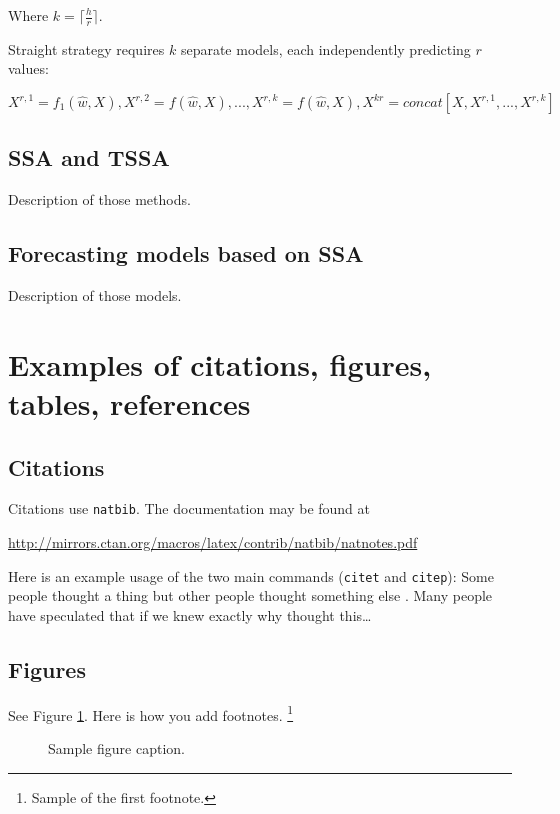 \documentclass{article}
\begin{document}
Where \( k = \lceil \frac{h}{r} \rceil.\)

Straight strategy requires \(k\) separate models, each independently predicting \(r\) values:

\begin{equation}
	X^{r, 1} = f_1(\widehat{w}, X), 
	X^{r, 2} = f(\widehat{w}, X),
	...,
	X^{r, k} = f(\widehat{w}, X),
	X^{kr} = concat[X, X^{r,1}, ..., X^{r, k}]
\end{equation}

\subsection{SSA and TSSA}

Description of those methods.

\subsection{Forecasting models based on SSA}

Description of those models.


\section{Examples of citations, figures, tables, references}
\label{sec:others}

\subsection{Citations}
Citations use \verb+natbib+. The documentation may be found at
\begin{center}
	\url{http://mirrors.ctan.org/macros/latex/contrib/natbib/natnotes.pdf}
\end{center}

Here is an example usage of the two main commands (\verb+citet+ and \verb+citep+): Some people thought a thing \citep{kour2014real, hadash2018estimate} but other people thought something else \citep{kour2014fast}. Many people have speculated that if we knew exactly why \citet{kour2014fast} thought this\dots

\subsection{Figures}
\lipsum[10]
See Figure \ref{fig:fig1}. Here is how you add footnotes. \footnote{Sample of the first footnote.}
\lipsum[11]

\begin{figure}
	\centering
	
	\caption{Sample figure caption.}
	\label{fig:fig1}
\end{figure}
\end{document}
